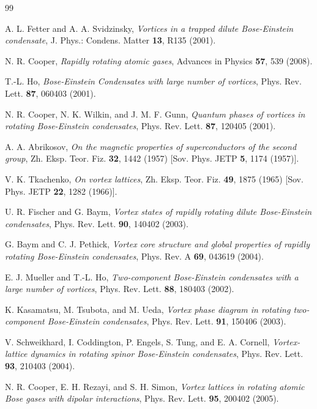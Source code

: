 \documentclass[reprint,aps,pra,twocolumn,superscriptaddress]{revtex4-1}
\begin{document}
\begin{thebibliography}{99}

 A. L. Fetter and A. A. Svidzinsky, \textit{Vortices in a trapped dilute Bose-Einstein condensate}, {J. Phys.: Condens. Matter {\bf 13}, R135 (2001)}.

  N. R. Cooper, \textit{Rapidly rotating atomic gases}, {Advances in Physics {\bf 57}, 539 (2008)}.

  T.-L. Ho, \textit{Bose-Einstein Condensates with large number of vortices}, {Phys. Rev. Lett. {\bf 87}, 060403 (2001)}.

 N. R. Cooper, N. K. Wilkin, and J. M. F. Gunn, \textit{Quantum phases of vortices in rotating Bose-Einstein condensates}, {Phys. Rev. Lett. {\bf 87}, 120405 (2001)}.


 A. A. Abrikosov, \textit{On the magnetic properties of superconductors of the second group}, Zh. Eksp. Teor. Fiz. {\bf 32}, 1442 (1957) [Sov. Phys. JETP {\bf 5}, 1174 (1957)].
    
 V. K. Tkachenko, \textit{On vortex lattices}, Zh. Eksp. Teor. Fiz. {\bf 49}, 1875 (1965) [Sov. Phys. JETP {\bf 22}, 1282 (1966)].

 U. R. Fischer and G. Baym, \textit{Vortex states of rapidly rotating dilute Bose-Einstein condensates},  {Phys. Rev. Lett. {\bf 90}, 140402 (2003)}.

 G. Baym and C. J. Pethick, \textit{Vortex core structure and global properties of rapidly rotating Bose-Einstein condensates},  {Phys. Rev. A {\bf 69}, 043619 (2004)}.

 E. J. Mueller and T.-L. Ho, \textit{Two-component Bose-Einstein condensates with a large number of vortices}, {Phys. Rev. Lett. {\bf 88}, 180403 (2002)}.

 K. Kasamatsu, M. Tsubota, and M. Ueda, \textit{Vortex phase diagram in rotating two-component Bose-Einstein condensates}, {Phys. Rev. Lett. {\bf 91}, 150406 (2003)}.

 V. Schweikhard, I. Coddington, P. Engels, S. Tung, and E. A. Cornell, \textit{Vortex-lattice dynamics in rotating spinor Bose-Einstein condensates},  {Phys. Rev. Lett. {\bf 93}, 210403 (2004)}.


 N. R. Cooper, E. H. Rezayi, and S. H. Simon, \textit{Vortex lattices in rotating atomic Bose gases with dipolar interactions}, {Phys. Rev. Lett. {\bf 95}, 200402 (2005)}.


\end{thebibliography}
\end{document}
